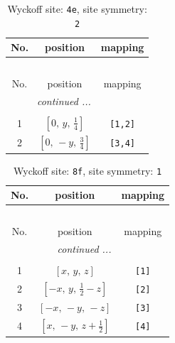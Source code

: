 \documentclass[fleqn,8pt]{jsarticle}
\begin{document}
\begin{longtable}{ccc}
\caption{Wyckoff site: {\tt 4e}, site symmetry: {\tt 2}}
 \\
 \hline \hline
No. & position & mapping \\ \hline \endfirsthead

\multicolumn{2}{l}{\tablename\ \thetable{}} \\
 \hline \hline
No. & position & mapping \\ \hline \endhead

 \hline \hline
\multicolumn{2}{r}{\footnotesize\it continued ...} \\ \endfoot

 \hline \hline
\multicolumn{2}{r}{} \\ \endlastfoot

1 & $\left[ 0,\, y,\, \frac{1}{4} \right]$ & {\tt [1,2]} \\ \hline
2 & $\left[ 0,\, - y,\, \frac{3}{4} \right]$ & {\tt [3,4]} \\
\end{longtable}
\renewcommand{\arraystretch}{1.2}
\begin{longtable}{ccc}
\caption{Wyckoff site: {\tt 8f}, site symmetry: {\tt 1}}
 \\
 \hline \hline
No. & position & mapping \\ \hline \endfirsthead

\multicolumn{2}{l}{\tablename\ \thetable{}} \\
 \hline \hline
No. & position & mapping \\ \hline \endhead

 \hline \hline
\multicolumn{2}{r}{\footnotesize\it continued ...} \\ \endfoot

 \hline \hline
\multicolumn{2}{r}{} \\ \endlastfoot

1 & $\left[ x,\, y,\, z \right]$ & {\tt [1]} \\ \hline
2 & $\left[ - x,\, y,\, \frac{1}{2} - z \right]$ & {\tt [2]} \\ \hline
3 & $\left[ - x,\, - y,\, - z \right]$ & {\tt [3]} \\ \hline
4 & $\left[ x,\, - y,\, z + \frac{1}{2} \right]$ & {\tt [4]} \\
\end{longtable}
\end{document}
